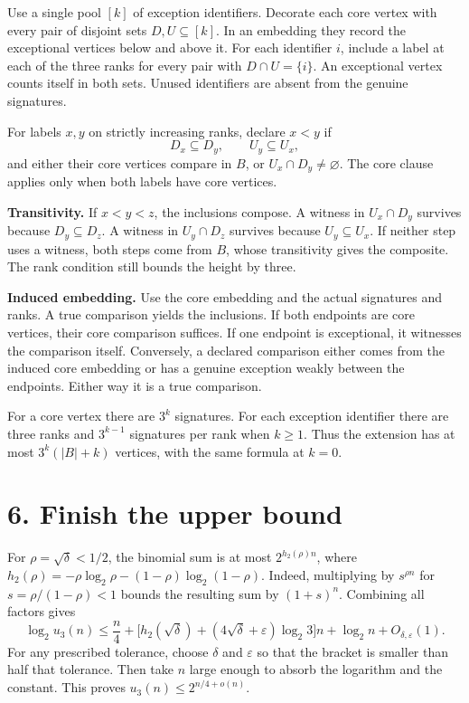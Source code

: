 \documentclass[11pt,a4paper]{article}
\begin{document}
Use a single pool \([k]\) of exception identifiers. Decorate each core
vertex with every pair of disjoint sets \(D,U\subseteq[k]\). In an
embedding they record the exceptional vertices below and above it. For
each identifier \(i\), include a label at each of the three ranks for
every pair with \(D\cap U=\{i\}\). An exceptional vertex counts itself
in both sets. Unused identifiers are absent from the genuine signatures.

For labels \(x,y\) on strictly increasing ranks, declare \(x<y\) if \[
D_x\subseteq D_y,\qquad U_y\subseteq U_x,
\] and either their core vertices compare in \(B\), or
\(U_x\cap D_y\ne\varnothing\). The core clause applies only when both
labels have core vertices.

\textbf{Transitivity.} If \(x<y<z\), the inclusions compose. A witness
in \(U_x\cap D_y\) survives because \(D_y\subseteq D_z\). A witness in
\(U_y\cap D_z\) survives because \(U_y\subseteq U_x\). If neither step
uses a witness, both steps come from \(B\), whose transitivity gives the
composite. The rank condition still bounds the height by three.

\textbf{Induced embedding.} Use the core embedding and the actual
signatures and ranks. A true comparison yields the inclusions. If both
endpoints are core vertices, their core comparison suffices. If one
endpoint is exceptional, it witnesses the comparison itself. Conversely,
a declared comparison either comes from the induced core embedding or
has a genuine exception weakly between the endpoints. Either way it is a
true comparison.

For a core vertex there are \(3^k\) signatures. For each exception
identifier there are three ranks and \(3^{k-1}\) signatures per rank
when \(k\ge1\). Thus the extension has at most \(3^k(|B|+k)\) vertices,
with the same formula at \(k=0\).

\section{6. Finish the upper bound}\label{finish-the-upper-bound}

For \(\rho=\sqrt\delta<1/2\), the binomial sum is at most
\(2^{h_2(\rho)n}\), where
\(h_2(\rho)=-\rho\log_2\rho-(1-\rho)\log_2(1-\rho)\). Indeed,
multiplying by \(s^{\rho n}\) for \(s=\rho/(1-\rho)<1\) bounds the
resulting sum by \((1+s)^n\). Combining all factors gives \[
\log_2 u_3(n)\le
\frac n4+
\bigl[h_2(\sqrt\delta)+(4\sqrt\delta+\varepsilon)\log_2 3\bigr]n
+\log_2 n+O_{\delta,\varepsilon}(1).
\] For any prescribed tolerance, choose \(\delta\) and \(\varepsilon\)
so that the bracket is smaller than half that tolerance. Then take \(n\)
large enough to absorb the logarithm and the constant. This proves
\(u_3(n)\le 2^{n/4+o(n)}\).
\end{document}
